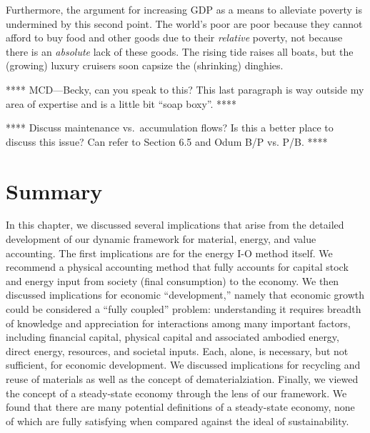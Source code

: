 Furthermore,
the argument for increasing GDP as a means
to alleviate poverty is undermined by this second point.
The world's poor are poor because they cannot afford to
buy food and other goods due to their \emph{relative} poverty,
not because there is an \emph{absolute} lack of these goods.
The rising tide raises all boats,
but the (growing) luxury cruisers soon capsize 
the (shrinking) dinghies.



**** MCD---Becky, can you speak to this? 
This last paragraph is way outside my area of expertise and
is a little bit ``soap boxy''. ****

**** Discuss maintenance vs.\ accumulation flows? 
Is this a better place to discuss this issue? Can refer to
Section 6.5 and Odum B/P vs. P/B. ****

%


\section{Summary}
\label{sec:summary_implications}

In this chapter, we discussed several implications that arise from 
the detailed development of our dynamic framework for material,
energy, and value accounting.
The first implications are for the energy I-O method itself. 
We recommend a physical accounting method that fully
accounts for capital stock and energy input from society (final consumption)
to the economy.
We then discussed implications for economic ``development,''
namely that economic growth could be considered a ``fully coupled'' problem: 
understanding it requires breadth of knowledge 
and appreciation for interactions among many important factors,
including financial capital, physical capital and associated ambodied energy,
direct energy, resources, and societal inputs.
Each, alone, is necessary, but not sufficient, for economic development.
We discussed implications for recycling and reuse of materials
as well as the concept of dematerialziation.
Finally, we viewed the concept of a steady-state economy through
the lens of our framework.
We found that there are many potential definitions of a steady-state economy,
none of which are fully satisfying when compared against the ideal 
of sustainability.

